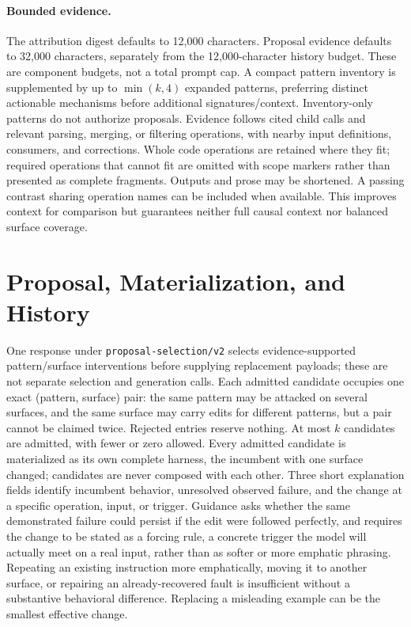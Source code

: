 \paragraph{Bounded evidence.}
The attribution digest defaults to 12,000 characters. Proposal evidence defaults
to 32,000 characters, separately from the 12,000-character history budget.
These are component budgets, not a total prompt cap. A compact pattern inventory
is supplemented by up to $\min(k,4)$ expanded patterns, preferring distinct
actionable mechanisms before additional signatures/context. Inventory-only
patterns do not authorize proposals. Evidence follows cited child calls and
relevant parsing, merging, or filtering operations, with nearby input definitions,
consumers, and corrections. Whole code operations are retained where they fit;
required operations that cannot fit are omitted with scope markers rather than
presented as complete fragments. Outputs and prose may be shortened. A passing
contrast sharing operation names can be included when available. This improves
context for comparison but guarantees neither full causal context nor balanced
surface coverage.

\section{Proposal, Materialization, and History}
\label{app:proposal}

One response under \texttt{proposal-selection/v2} selects evidence-supported
pattern/surface interventions before supplying replacement payloads; these are
not separate selection and generation calls. Each admitted candidate occupies
one exact (pattern, surface) pair: the same pattern may be attacked on several
surfaces, and the same surface may carry edits for different patterns, but a
pair cannot be claimed twice. Rejected entries reserve nothing. At most $k$
candidates are admitted, with fewer or zero allowed. Every admitted candidate is
materialized as its own complete harness, the incumbent with one surface
changed; candidates are never composed with each other. Three short explanation
fields identify incumbent behavior, unresolved observed failure, and the change
at a specific operation, input, or trigger. Guidance asks whether the same
demonstrated failure could persist if the edit were followed perfectly, and
requires the change to be stated as a forcing rule, a concrete trigger the
model will actually meet on a real input, rather than as softer or more
emphatic phrasing. Repeating an existing instruction more emphatically, moving
it to another surface, or repairing an already-recovered fault is insufficient
without a substantive behavioral difference. Replacing a misleading example can
be the smallest effective change.

